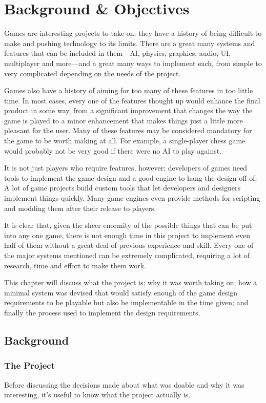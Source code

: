 \chapter{Background \& Objectives}

Games are interesting projects to take on; they have a history of being difficult to make and pushing technology to its limits. There are a great many systems and features that can be included in them---AI, physics, graphics, audio, UI, multiplayer and more---and a great many ways to implement each, from simple to very complicated depending on the needs of the project.

Games also have a history of aiming for too many of these features in too little time. In most cases, every one of the features thought up would enhance the final product in some way, from a significant improvement that changes the way the game is played to a minor enhancement that makes things just a little more pleasant for the user. Many of these features may be considered mandatory for the game to be worth making at all. For example, a single-player chess game would probably not be very good if there were no AI to play against.

It is not just players who require features, however; developers of games need tools to implement the game design and a good engine to hang the design off of. A lot of game projects build custom tools that let developers and designers implement things quickly. Many game engines even provide methods for scripting and modding them after their release to players.

It is clear that, given the sheer enormity of the possible things that can be put into any one game, there is not enough time in this project to implement even half of them without a great deal of previous experience and skill. Every one of the major systems mentioned can be extremely complicated, requiring a lot of research, time and effort to make them work.

This chapter will discuss what the project is; why it was worth taking on; how a minimal system was devised that would satisfy enough of the game design requirements to be playable but also be implementable in the time given; and finally the process used to implement the design requirements.

\section{Background}

\subsection{The Project}
Before discussing the decisions made about what was doable and why it was interesting, it's useful to know what the project actually is.

